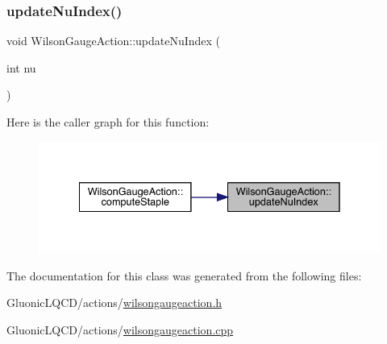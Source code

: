 \subsubsection{\texorpdfstring{updateNuIndex()}{updateNuIndex()}}
{\footnotesize\ttfamily void Wilson\+Gauge\+Action\+::update\+Nu\+Index (\begin{DoxyParamCaption}\item[{int}]{nu }\end{DoxyParamCaption})\hspace{0.3cm}{\ttfamily [inline]}}

Here is the caller graph for this function\+:\nopagebreak
\begin{figure}[H]
\begin{center}
\leavevmode
\includegraphics[width=335pt]{class_wilson_gauge_action_a010b3b8870476dfec4c48a01b6d6fc1d_icgraph}
\end{center}
\end{figure}


The documentation for this class was generated from the following files\+:\begin{DoxyCompactItemize}
\item 
Gluonic\+L\+Q\+C\+D/actions/\mbox{\hyperlink{wilsongaugeaction_8h}{wilsongaugeaction.\+h}}\item 
Gluonic\+L\+Q\+C\+D/actions/\mbox{\hyperlink{wilsongaugeaction_8cpp}{wilsongaugeaction.\+cpp}}\end{DoxyCompactItemize}
